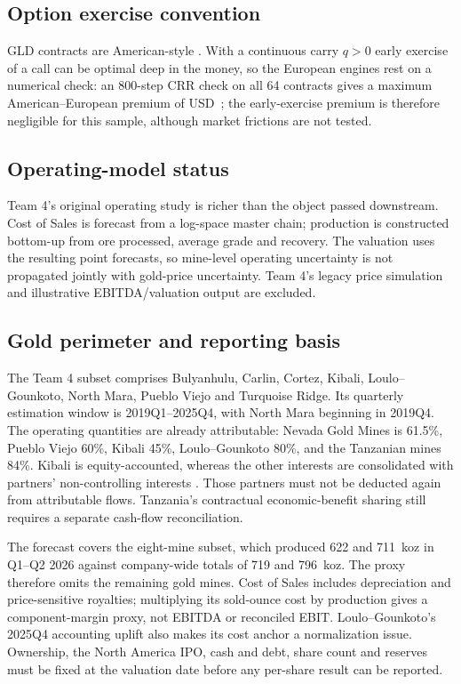 \subsection{Option exercise convention}
GLD contracts are American-style \citep{cboe2026}. With a continuous carry $q>0$ early exercise of a call can be optimal deep in the money, so the European engines rest on a numerical check: an 800-step CRR check on all 64 contracts gives a maximum American--European premium of USD~\AmericanPremiumMax; the early-exercise premium is therefore negligible for this sample, although market frictions are not tested.

\subsection{Operating-model status}
Team 4's original operating study is richer than the object passed downstream. Cost of Sales is forecast from a log-space master chain; production is constructed bottom-up from ore processed, average grade and recovery. The valuation uses the resulting point forecasts, so mine-level operating uncertainty is not propagated jointly with gold-price uncertainty. Team 4's legacy price simulation and illustrative EBITDA/valuation output are excluded.

\subsection{Gold perimeter and reporting basis}
The Team 4 subset comprises Bulyanhulu, Carlin, Cortez, Kibali, Loulo--Gounkoto, North Mara, Pueblo Viejo and Turquoise Ridge. Its quarterly estimation window is 2019Q1--2025Q4, with North Mara beginning in 2019Q4. The operating quantities are already attributable: Nevada Gold Mines is 61.5\%, Pueblo Viejo 60\%, Kibali 45\%, Loulo--Gounkoto 80\%, and the Tanzanian mines 84\%. Kibali is equity-accounted, whereas the other interests are consolidated with partners' non-controlling interests \citep{barrickar2025}. Those partners must not be deducted again from attributable flows. Tanzania's contractual economic-benefit sharing still requires a separate cash-flow reconciliation.

The forecast covers the eight-mine subset, which produced 622 and 711~koz in Q1--Q2 2026 against company-wide totals of 719 and 796~koz. The proxy therefore omits the remaining gold mines. Cost of Sales includes depreciation and price-sensitive royalties; multiplying its sold-ounce cost by production gives a component-margin proxy, not EBITDA or reconciled EBIT. Loulo--Gounkoto's 2025Q4 accounting uplift also makes its cost anchor a normalization issue. Ownership, the North America IPO, cash and debt, share count and reserves must be fixed at the valuation date before any per-share result can be reported.
